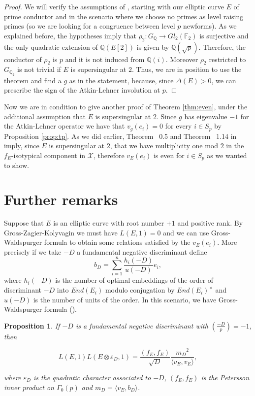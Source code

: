 \documentclass[13pt]{amsart}
\newtheorem{proposition}[theorem]{Proposition}
\theoremstyle{remark}
\numberwithin{theorem}{section} \numberwithin{equation}{section}
\begin{document}
\begin{proof}
We will verify the assumptions of \cite[Theorem ~2.9]{LeH}, starting with our elliptic curve $E$ of prime conductor and in the scenario where we choose
no primes as level raising primes (so we are looking for a congruence between level $p$ newforms).
As we explained before, the hypotheses imply that ${\rho}_{2}: G_{\mathbb{Q}} 
\rightarrow Gl_{2}(\mathbb{F}_{2})$ is surjective and the only quadratic 
extension of $\mathbb{Q}(E[2])$ is given by $\mathbb{Q}(\sqrt{p})$. Therefore, 
the conductor of ${\rho}_{2}$ is $p$  and it is not induced
from $\mathbb{Q}(i)$. Moreover ${\rho}_{2}$ restricted to $G_{\mathbb{Q}_{2}}$ 
is not trivial if  $E$ is supersingular at $2$. Thus, we are in position to 
use the theorem and find a $g$ as in the statement, because, since $\Delta(E)>0$, we can prescribe the sign of the Atkin-Lehner involution at $p$.
\end{proof}

Now we are in condition to give another proof of Theorem \ref{thm:even}, under the additional assumption that $E$ is supersingular at $2$. 
Since $g$ has eigenvalue $-1$ for the Atkin-Lehner operator we have that $v_g(e_i)=0$
for every $i \in S_{p}$ by Proposition \ref{prop:tp}. As we did earlier, Theorem 
~0.5 and Theorem ~1.14 in \cite{Emerton} imply, since $E$ is supersingular 
at $2$, that we have multiplicity one mod $2$ in the $f_E$-isotypical component 
in ${\mathcal{X}}$, therefore $v_E(e_{i})$ is even for $i \in S_{p}$ as we wanted to show.

\section{Further remarks}
Suppose that $E$ is an elliptic curve with root number $+1$ and positive rank. 
By Gross-Zagier-Kolyvagin we must have $L(E,1)=0$ and we can use 
Gross-Waldspurger formula to obtain some relations satisfied by the 
$v_{E}(e_{i})$. More precisely if we take $-D$ a fundamental negative 
discriminant define
\[ b_D= \sum_{i=1}^{n} \frac{h_i(-D)}{u(-D)} e_i  ,\]
where $h_i(-D)$ is the number of optimal embeddings of the order of discriminant 
$-D$ into $End(E_{i})$ modulo conjugation by $End(E_{i})^{\times}$ and
$u(-D)$ is the number of units of the order.
In this scenario, we have Gross-Waldspurger formula (\cite[Proposition ~13.5]{Gross}).

 
 \begin{proposition} \label{prop:Gross}
 If $-D$ is a fundamental negative discriminant with $ 
\left(\frac{-D}{p}\right)=-1$, then
 
 \[ L(E,1)L(E \otimes \varepsilon_D,1)= \frac{\left(f_E,f_E \right)}{\sqrt{D}} 
\frac{{m_D}^2}{ \langle v_E, v_E \rangle } ,\] 
 
 where $\varepsilon_D$ is the quadratic character associated to $-D$, 
$\left(f_E,f_E \right)$ is the Petersson inner product on $\Gamma_{0}(p)$ and
$m_D= \langle v_E, b_D \rangle$.

\end{proposition}
\end{document}
